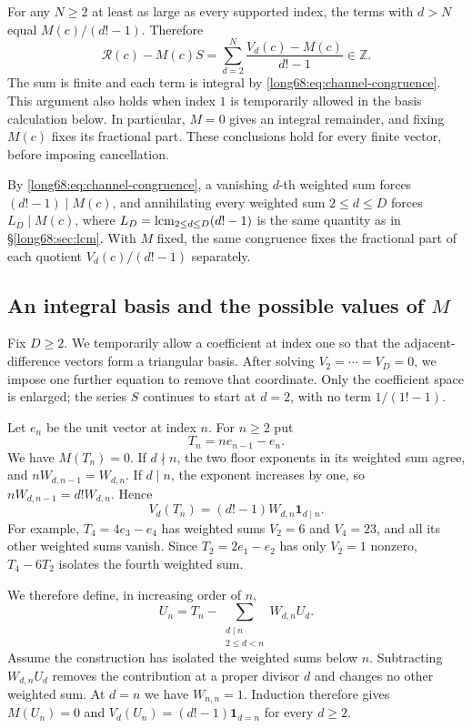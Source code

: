 \documentclass[11pt]{article}
\newcommand{\Ser}{S}
\newcommand{\Lc}{L}
\begin{document}
For any $N\ge2$ at least as large as every supported index, the terms
with $d>N$ equal $M(c)/(d!-1)$. Therefore
\[
 \mathcal R(c)-M(c)\Ser
 =\sum_{d=2}^N\frac{V_d(c)-M(c)}{d!-1}\in\mathbb Z.
\]
The sum is finite and each term is integral by
\eqref{long68:eq:channel-congruence}. This argument also holds when
index $1$ is temporarily allowed in the basis calculation below.
In particular, $M=0$ gives an integral remainder, and fixing
$M(c)$ fixes its fractional part. These conclusions hold for every
finite vector, before imposing cancellation.

By \eqref{long68:eq:channel-congruence}, a vanishing $d$-th weighted sum forces $(d!-1)\mid M(c)$,
and annihilating every weighted sum $2\le d\le D$ forces $\Lc_D\mid M(c)$, where
$\Lc_D=\lcm_{2\le d\le D}(d!-1)$ is the same quantity as in
\S\ref{long68:sec:lcm}. With $M$ fixed, the same congruence fixes the
fractional part of each quotient $V_d(c)/(d!-1)$ separately.

\subsection{An integral basis and the possible values of \texorpdfstring{$M$}{M}}\label{long68:sec:basis}

Fix $D\ge2$. We temporarily allow a coefficient at index one so that
the adjacent-difference vectors form a triangular basis. After solving
$V_2=\cdots=V_D=0$, we impose one further equation to remove that
coordinate. Only the coefficient space is enlarged; the series $S$
continues to start at $d=2$, with no term $1/(1!-1)$.

Let $e_n$ be the unit vector at index $n$. For $n\ge2$ put
\[
 T_n=ne_{n-1}-e_n.
\]
We have $M(T_n)=0$. If $d\nmid n$, the two floor exponents in its weighted
sum agree, and $nW_{d,n-1}=W_{d,n}$. If $d\mid n$, the exponent increases
by one, so $nW_{d,n-1}=d!W_{d,n}$. Hence
\[
 V_d(T_n)=(d!-1)W_{d,n}\mathbf1_{d\mid n}.
\]
For example, $T_4=4e_3-e_4$ has weighted sums $V_2=6$ and $V_4=23$,
and all its other weighted sums vanish. Since $T_2=2e_1-e_2$ has only
$V_2=1$ nonzero, $T_4-6T_2$ isolates the fourth weighted sum.

We therefore define, in increasing order of $n$,
\[
 U_n=T_n-\sum_{\substack{d\mid n\\2\le d<n}}W_{d,n}U_d.
\]
Assume the construction has isolated the weighted sums below $n$.
Subtracting $W_{d,n}U_d$ removes the contribution at a proper divisor
$d$ and changes no other weighted sum. At $d=n$ we have $W_{n,n}=1$.
Induction therefore gives $M(U_n)=0$ and
$V_d(U_n)=(d!-1)\mathbf1_{d=n}$ for every $d\ge2$.
\end{document}

